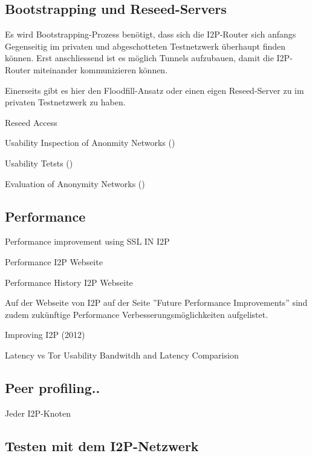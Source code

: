 \subsection{Bootstrapping und Reseed-Servers}

Es wird Bootstrapping-Prozess benötigt, dass sich die I2P-Router sich anfangs Gegenseitig im privaten und abgeschotteten Testnetzwerk überhaupt finden können.
Erst anschliessend ist es möglich Tunnels aufzubauen, damit die I2P-Router miteinander kommunizieren können.


Einerseits gibt es hier den Floodfill-Ansatz oder einen eigen Reseed-Server zu im privaten Testnetzwerk zu haben.

Reseed Access
\cite{noauthor_i2p_nodate-7}

Usability Inspection of Anonmity Networks
(\cite{abou-tair_usability_2009})

Usability Tetsts
(\cite{schomburg_anonymity_2009})

Evaluation of Anonymity Networks
(\cite{timpanaro_evaluation_2015})

\subsection{Performance}


Performance improvement using SSL IN I2P
\cite{vashi_performance_2015}

Performance I2P Webseite
\cite{noauthor_performance_nodate}

Performance History I2P Webseite
\cite{noauthor_performance_nodate-1}

Auf der Webseite von I2P auf der Seite ''Future Performance Improvements'' sind zudem zukünftige Performance Verbesserungsmöglichkeiten aufgelistet.
\cite{noauthor_future_nodate}

Improving I2P (2012)
\cite{timpanaro_improving_2012}

Latency vs Tor Usability Bandwitdh and Latency Comparision
\cite{ehlert_i2p_2021}


\subsection{Peer profiling..}

Jeder I2P-Knoten


\subsection{Testen mit dem I2P-Netzwerk}

